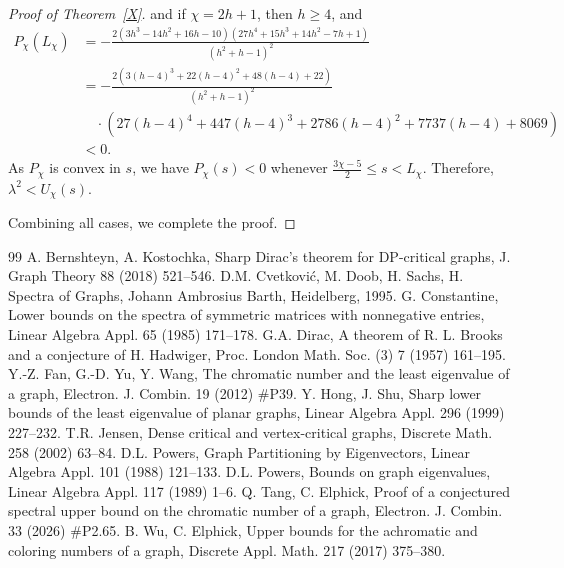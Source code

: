 \documentclass[10pt,a4paper]{amsart}
\begin{document}
\begin{proof}[Proof of Theorem~\ref{X}]
and if $\chi=2h+1$, then $h\ge 4$, and  
\begin{align*}
P_\chi(L_\chi)&=-\frac{2(3h^3-14h^2+16h-10)(27h^4+15h^3+14h^2-7h+1)}{(h^2+h-1)^2}\\
&=-\frac{2\left(3(h-4)^3+22(h-4)^2+48(h-4)+22\right)}{(h^2+h-1)^2}\\
&\quad \cdot \left( 27(h-4)^4+447(h-4)^3+2786(h-4)^2+7737(h-4)+8069\right)\\
&<0.
\end{align*} 
As $P_\chi$ is convex in $s$, we have $P_\chi(s)<0$ whenever $\frac{3\chi-5}{2}\le s<L_\chi$. Therefore, $\lambda^2<U_\chi(s)$. %

Combining all cases, we complete the proof.
\end{proof}


\begin{thebibliography}{99}
 A. Bernshteyn, A. Kostochka, Sharp Dirac's theorem for DP-critical graphs, J. Graph Theory 88 (2018) 521--546.
 D.M. Cvetkovi\'{c}, M. Doob, H. Sachs, H. Spectra of Graphs, Johann Ambrosius Barth, Heidelberg, 1995.
 G. Constantine, Lower bounds on the spectra of symmetric matrices with nonnegative entries, Linear Algebra Appl. 65 (1985) 171--178.
 G.A. Dirac, A theorem of R. L. Brooks and a conjecture of H. Hadwiger, Proc. London Math. Soc. (3) 7 (1957) 161--195.
 Y.-Z. Fan, G.-D. Yu, Y. Wang, The chromatic number and the least eigenvalue of a graph, Electron. J. Combin. 19 (2012) \#P39.
 Y. Hong, J. Shu, Sharp lower bounds of the least eigenvalue of planar graphs, Linear Algebra Appl. 296 (1999) 227--232.
 T.R. Jensen, Dense critical and vertex-critical graphs, Discrete Math. 258 (2002) 63--84.
 D.L. Powers, Graph Partitioning by Eigenvectors, Linear Algebra Appl. 101 (1988) 121--133.
 D.L. Powers, Bounds on graph eigenvalues, Linear Algebra Appl. 117 (1989) 1--6.
 Q. Tang, C. Elphick, Proof of a conjectured spectral upper bound on the chromatic number of a graph, Electron. J. Combin. 33 (2026) \#P2.65.
 B. Wu, C. Elphick, Upper bounds for the achromatic and coloring numbers of a graph, Discrete Appl. Math. 217 (2017) 375--380.
\end{thebibliography}
\end{document}
